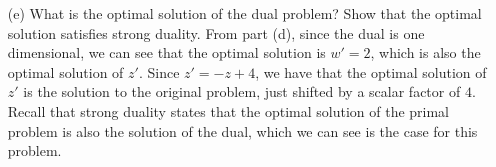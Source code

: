 \documentclass{article}
\begin{document}
\begin{itemize}
\begin{itemize}
        \item[(e)] What is the optimal solution of the dual problem? Show that the optimal solution satisfies strong duality.
        \newline\newline
        From part (d), since the dual is one dimensional, we can see that the optimal solution is $w' = 2$, which is also the optimal solution of $z'$. Since $z' = -z + 4$, we have that the optimal solution of $z'$ is the solution to the original problem, just shifted by a scalar factor of $4$. Recall that strong duality states that the optimal solution of the primal problem is also the solution of the dual, which we can see is the case for this problem.
        
    \end{itemize}
\end{itemize}
\end{document}
